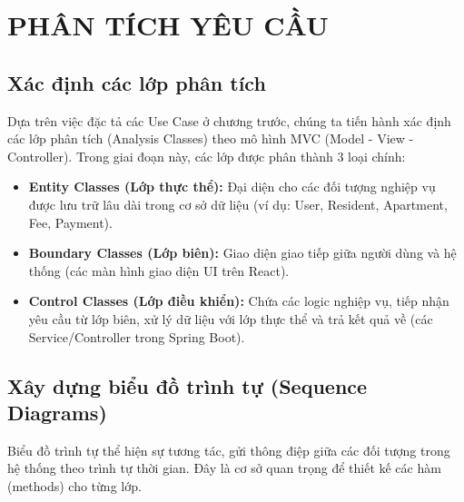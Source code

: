 \documentclass[12pt,a4paper]{article}
\begin{document}
\section{PHÂN TÍCH YÊU CẦU}

\subsection{Xác định các lớp phân tích}

Dựa trên việc đặc tả các Use Case ở chương trước, chúng ta tiến hành xác định các lớp phân tích (Analysis Classes) theo mô hình MVC (Model - View - Controller). Trong giai đoạn này, các lớp được phân thành 3 loại chính:
\begin{itemize}
    \item \textbf{Entity Classes (Lớp thực thể):} Đại diện cho các đối tượng nghiệp vụ được lưu trữ lâu dài trong cơ sở dữ liệu (ví dụ: User, Resident, Apartment, Fee, Payment).
    \item \textbf{Boundary Classes (Lớp biên):} Giao diện giao tiếp giữa người dùng và hệ thống (các màn hình giao diện UI trên React).
    \item \textbf{Control Classes (Lớp điều khiển):} Chứa các logic nghiệp vụ, tiếp nhận yêu cầu từ lớp biên, xử lý dữ liệu với lớp thực thể và trả kết quả về (các Service/Controller trong Spring Boot).
\end{itemize}

\subsection{Xây dựng biểu đồ trình tự (Sequence Diagrams)}

Biểu đồ trình tự thể hiện sự tương tác, gửi thông điệp giữa các đối tượng trong hệ thống theo trình tự thời gian. Đây là cơ sở quan trọng để thiết kế các hàm (methods) cho từng lớp.
\end{document}
